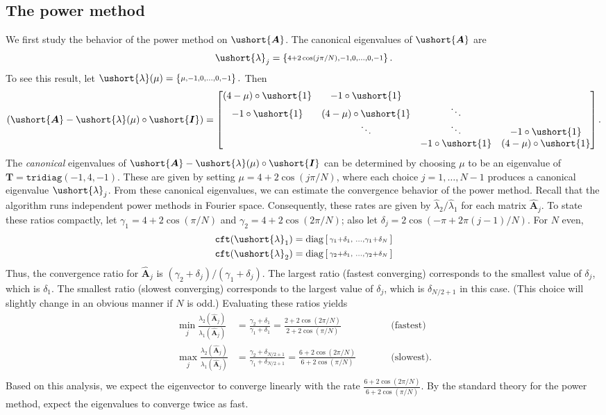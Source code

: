 \documentclass[1p,authoryear,letterpaper]{elsarticle}
\providecommand{\bmat}[1]{\begin{bmatrix} #1 \end{bmatrix}}
\providecommand{\sbmat}[1]{\left[\begin{smallmatrix} #1 \end{smallmatrix}\right]}
\providecommand{\mat}{\boldsymbol}
\providecommand{\mT}{\ensuremath{\mat{T}}}
\providecommand{\mhat}[1]{\ensuremath{\mat{\hat{#1}}}}
\providecommand{\mAhat}{\mhat{A}}
\DeclareMathOperator{\cft}{\texttt{cft}}
\newcommand{\cel}[1]{\ushort{#1}}
\newcommand{\csbmat}[1]{\left\{\! \begin{smallmatrix} #1
\end{smallmatrix} \! \right\}}
\newcommand{\celm}[1]{\cel{\mat{#1}}}
\newcommand{\clambda}{\ensuremath{\cel{\lambda}}}
\providecommand{\cmA}{\ensuremath{\celm{A}}}
\providecommand{\cmI}{\ensuremath{\celm{I}}}
\begin{document}
\subsection{The power method}

We first study the behavior of the power method
on $\cmA$.
The canonical eigenvalues of $\cmA$ are
\[ \clambda_j = \csbmat{ 4 + 2\cos(j \pi / {N}), -1, 0, \ldots, 0, -1 }. \]
To see this result, let
$\clambda(\mu) =\csbmat{ \mu, -1, 0, \ldots, 0, -1 }.$
Then
\[ (\cmA - \clambda(\mu) \circ \cmI)
 = \bmat{ (4-\mu) \circ \cel{1} & -1 \circ \cel{1} \\
          -1 \circ \cel{1} & (4-\mu) \circ \cel{1} & \ddots \\
          & \ddots & \ddots & -1 \circ \cel{1} \\
          & & -1 \circ \cel{1} & (4-\mu) \circ \cel{1} }.
\]
The \emph{canonical} eigenvalues of $\cmA - \clambda(\mu) \circ \cmI$
can be determined by choosing $\mu$ to be an eigenvalue of $\mT =
\texttt{tridiag}(-1,4,-1)$.  These are given
 by setting $\mu = 4 + 2\cos(j \pi / {N})$,
where each choice $j=1, \ldots, N-1$ produces a canonical
eigenvalue $\clambda_j$. 
From these canonical eigenvalues, we can estimate the convergence
behavior of the power method.  Recall that the algorithm runs
independent power methods in Fourier space.  Consequently, these
rates are given by $\hat{\lambda}_2/\hat{\lambda}_1$ for each
matrix $\mAhat_j$.  To state these ratios compactly,
let $\gamma_1 = 4 + 2\cos( \pi / {N})$ and $\gamma_2 =
4 + 2\cos(2 \pi / {N})$; also let $\delta_j = 2 \cos (-\pi + 2\pi(j-1)/N)$.  
For $N$ even, 
\[
\begin{aligned}
\cft(\clambda_1) & =
  \diag\sbmat{ \gamma_1 + \delta_1, & \ldots, \gamma_1 + \delta_N} \\
\cft(\clambda_2) & =
  \diag\sbmat{ \gamma_2 + \delta_1, & \ldots, \gamma_2 + \delta_N}	
\end{aligned}
\]	
Thus, the convergence ratio for $\mAhat_j$ is $(\gamma_2 + \delta_j)/(\gamma_1 + \delta_j)$.
The largest ratio (fastest converging)  corresponds to the smallest value of $\delta_j$, which is $\delta_1$.  The smallest ratio (slowest
converging) corresponds to the largest value of $\delta_j$,
which is $\delta_{N/2+1}$ in this case.  
(This choice will slightly change in an obvious manner if $N$ is odd.)  Evaluating these ratios yields
\[ \begin{aligned}
\min_j \frac{\lambda_2(\mAhat_j)}{\lambda_1(\mAhat_j)} & = \frac{\gamma_2 + \delta_1}{\gamma_1 + \delta_1} = \frac{2 + 2\cos(2\pi/N)}{2 + 2\cos(\pi/N)} && \qquad \text{(fastest)} \\
\max_j \frac{\lambda_2(\mAhat_j)}{\lambda_1(\mAhat_j)} & = \frac{\gamma_2 + \delta_{N/2+1}}{\gamma_1 + \delta_{N/2+1}} = \frac{6 + 2\cos(2\pi/N)}{6 + 2\cos(\pi/N)} && \qquad \text{(slowest)}. \\
\end{aligned}
\]
Based on this analysis, we expect the eigenvector to
converge linearly with the rate $\frac{6 + 2\cos(2\pi/N)}{6 + 2\cos(\pi/N)}$.
By the standard theory for the power method, expect the eigenvalues to converge twice as fast.
\end{document}
